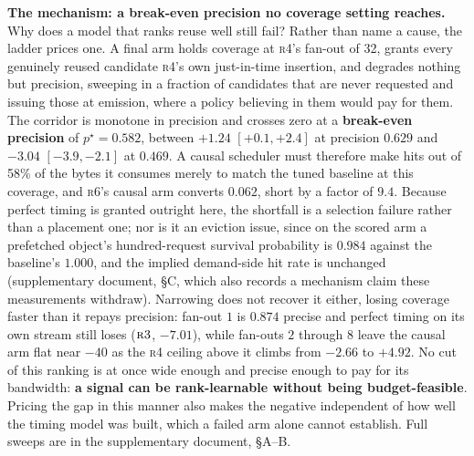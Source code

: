 \documentclass[letterpaper]{article} %
\newcommand{\rung}[1]{\textsc{#1}}
\begin{document}
\textbf{The mechanism: a break-even precision no coverage setting reaches.} Why does a model that ranks reuse well still fail? Rather than name a cause, the ladder prices one. A final arm holds coverage at \rung{r4}'s fan-out of 32, grants every genuinely reused candidate \rung{r4}'s own just-in-time insertion, and degrades nothing but precision, sweeping in a fraction of candidates that are never requested and issuing those at emission, where a policy believing in them would pay for them. The corridor is monotone in precision and crosses zero at a \textbf{break-even precision} of $p^{\star}=0.582$, between $+1.24$ $[+0.1,+2.4]$ at precision $0.629$ and $-3.04$ $[-3.9,-2.1]$ at $0.469$. A causal scheduler must therefore make hits out of 58\% of the bytes it consumes merely to match the tuned baseline at this coverage, and \rung{r6}'s causal arm converts $0.062$, short by a factor of $9.4$. Because perfect timing is granted outright here, the shortfall is a selection failure rather than a placement one; nor is it an eviction issue, since on the scored arm a prefetched object's hundred-request survival probability is $0.984$ against the baseline's $1.000$, and the implied demand-side hit rate is unchanged (supplementary document, \S C, which also records a mechanism claim these measurements withdraw). Narrowing does not recover it either, losing coverage faster than it repays precision: fan-out $1$ is $0.874$ precise and perfect timing on its own stream still loses ($\rung{r3}$, $-7.01$), while fan-outs $2$ through $8$ leave the causal arm flat near $-40$ as the \rung{r4} ceiling above it climbs from $-2.66$ to $+4.92$. No cut of this ranking is at once wide enough and precise enough to pay for its bandwidth: \textbf{a signal can be rank-learnable without being budget-feasible}. Pricing the gap in this manner also makes the negative independent of how well the timing model was built, which a failed arm alone cannot establish. Full sweeps are in the supplementary document, \S A--B.
\end{document}
